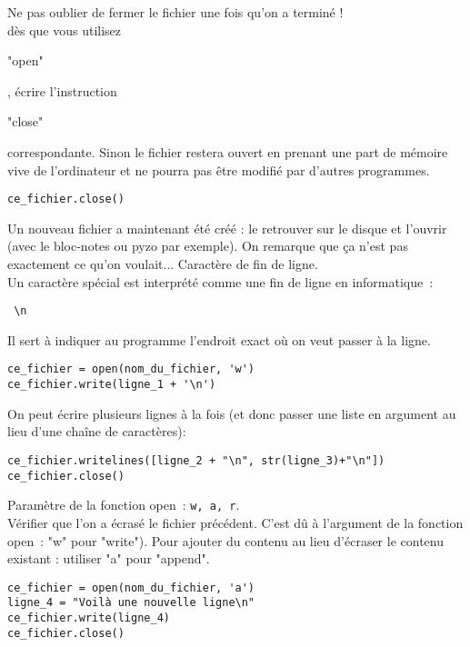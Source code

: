 \begin{enonce}
	Ne pas oublier de fermer le fichier une fois qu'on a terminé !
	\\

	 dès que vous utilisez \begin{texttt}"open"\end{texttt}, écrire l'instruction \begin{texttt}"close"\end{texttt} correspondante. Sinon le fichier restera ouvert en prenant une part de mémoire vive de l'ordinateur et ne pourra pas être modifié par d'autres programmes.

	\begin{verbatim}ce_fichier.close()\end{verbatim}

	Un nouveau fichier a maintenant été créé : le retrouver sur le disque et l'ouvrir (avec le bloc-notes ou pyzo par exemple).  On remarque que ça n'est pas exactement ce qu'on voulait...
	\ques 	Caractère de fin de ligne.\\

	Un caractère spécial est interprété comme une fin de ligne en informatique : \begin{verbatim} \n\end{verbatim} Il sert à indiquer au programme l'endroit exact où on veut passer à la ligne.

	\begin{verbatim}
ce_fichier = open(nom_du_fichier, 'w')
ce_fichier.write(ligne_1 + '\n')
\end{verbatim}


	On peut écrire plusieurs lignes à la fois (et donc passer une liste en argument au lieu d'une chaîne de caractères):


	\begin{verbatim}
ce_fichier.writelines([ligne_2 + "\n", str(ligne_3)+"\n"])
ce_fichier.close()
\end{verbatim}

	\ques 	Paramètre de la fonction open : \texttt{w, a, r}.\\

	Vérifier que l'on a écrasé le fichier précédent. C'est dû à l'argument de la fonction open : "w"  pour "write"). Pour ajouter du contenu au lieu d'écraser le contenu existant : utiliser "a" pour "append".

	\begin{verbatim}
ce_fichier = open(nom_du_fichier, 'a')
ligne_4 = "Voilà une nouvelle ligne\n"
ce_fichier.write(ligne_4)
ce_fichier.close()
\end{verbatim}


\end{enonce}
